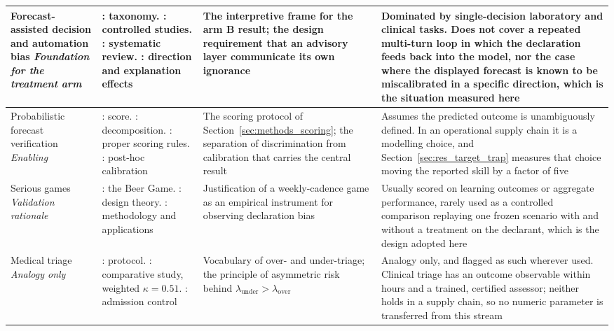 \begin{longtable}{>{\raggedright\arraybackslash}p{2.6cm} >{\raggedright\arraybackslash}p{3.0cm} >{\raggedright\arraybackslash}p{3.4cm} >{\raggedright\arraybackslash}p{4.4cm}}
Forecast-assisted decision and automation bias \newline \textit{Foundation for the treatment
arm} &
\autocite{parasuraman1997humans}: taxonomy. \autocite{skitka1999automation,cummings2004automation}:
controlled studies. \autocite{goddard2012automation}: systematic review.
\autocite{dietvorst2015algorithm,logg2019algorithm,bansal2021whole}: direction and
explanation effects &
The interpretive frame for the arm B result; the design requirement that an advisory layer
communicate its own ignorance &
Dominated by single-decision laboratory and clinical tasks. Does not cover a repeated
multi-turn loop in which the declaration feeds back into the model, nor the case where the
displayed forecast is known to be miscalibrated in a specific direction, which is the
situation measured here \\
\midrule

Probabilistic forecast verification \newline \textit{Enabling} &
\autocite{brier1950verification}: score. \autocite{murphy1973vector}: decomposition.
\autocite{gneiting2007strictly}: proper scoring rules.
\autocite{niculescu2005predicting,guo2017calibration}: post-hoc calibration &
The scoring protocol of Section~\ref{sec:methods_scoring}; the separation of discrimination
from calibration that carries the central result &
Assumes the predicted outcome is unambiguously defined. In an operational supply chain it is
a modelling choice, and Section~\ref{sec:res_target_trap} measures that choice moving the
reported skill by a factor of five \\
\midrule

Serious games \newline \textit{Validation rationale} &
\autocite{sterman1989modeling}: the Beer Game. \autocite{prensky2001digital,deterding2011game}:
design theory. \autocite{mohaddesi2020gamettes,bellotti2013framework,lafkihi2025freight}:
methodology and applications &
Justification of a weekly-cadence game as an empirical instrument for observing declaration
bias &
Usually scored on learning outcomes or aggregate performance, rarely used as a controlled
comparison replaying one frozen scenario with and without a treatment on the declarant,
which is the design adopted here \\
\midrule

Medical triage \newline \textit{Analogy only} &
\autocite{mackway2013emergency}: protocol. \autocite{kuligowski2025comparative}: comparative
study, weighted $\kappa = 0.51$. \autocite{kim2020admission}: admission control &
Vocabulary of over- and under-triage; the principle of asymmetric risk behind
$\lambda_{\text{under}} > \lambda_{\text{over}}$ &
Analogy only, and flagged as such wherever used. Clinical triage has an outcome observable
within hours and a trained, certified assessor; neither holds in a supply chain, so no
numeric parameter is transferred from this stream \\
\midrule


\end{longtable}
